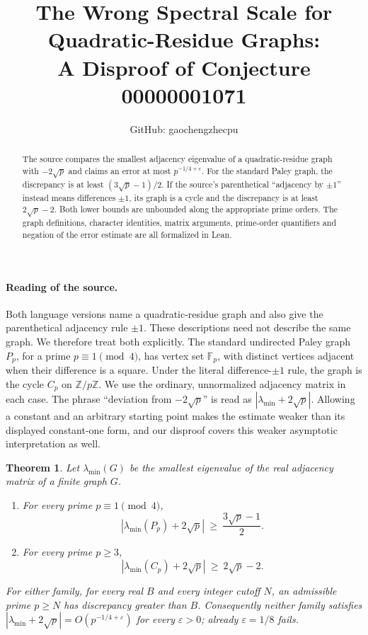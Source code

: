 \documentclass[11pt]{article}
\title{The Wrong Spectral Scale for Quadratic-Residue Graphs:\\A Disproof of Conjecture 00000001071}
\author{GitHub: gaochengzhecpu}
\date{}
\newtheorem{theorem}{Theorem}
\begin{document}
\maketitle
\begin{abstract}
The source compares the smallest adjacency eigenvalue of a quadratic-residue
graph with $-2\sqrt p$ and claims an error at most $p^{-1/4+\varepsilon}$.
For the standard Paley graph, the discrepancy is at least
$(3\sqrt p-1)/2$. If the source's parenthetical ``adjacency by $\pm1$''
instead means differences $\pm1$, its graph is a cycle and the discrepancy
is at least $2\sqrt p-2$. Both lower bounds are unbounded along the
appropriate prime orders. The graph definitions, character identities,
matrix arguments, prime-order quantifiers and negation of the error estimate
are all formalized in Lean.
\end{abstract}

\paragraph{Reading of the source.}
Both language versions name a quadratic-residue graph and also give the
parenthetical adjacency rule $\pm1$. These descriptions need not describe
the same graph. We therefore treat both explicitly. The standard undirected
Paley graph $P_p$, for a prime $p\equiv1\pmod4$, has vertex set
$\mathbb F_p$, with distinct vertices adjacent when their difference is a
square. Under the literal difference-$\pm1$ rule, the graph is the cycle
$C_p$ on $\mathbb Z/p\mathbb Z$. We use the ordinary, unnormalized adjacency
matrix in each case. The phrase ``deviation from $-2\sqrt p$'' is read as
$|\lambda_{\min}+2\sqrt p|$. Allowing a constant and an arbitrary starting
point makes the estimate weaker than its displayed constant-one form, and
our disproof covers this weaker asymptotic interpretation as well.

\begin{theorem}\label{thm:main}
Let $\lambda_{\min}(G)$ be the smallest eigenvalue of the real adjacency
matrix of a finite graph $G$.
\begin{enumerate}
\item For every prime $p\equiv1\pmod4$,
\[
 |\lambda_{\min}(P_p)+2\sqrt p|\ \geq\ \frac{3\sqrt p-1}{2}.
\]
\item For every prime $p\geq3$,
\[
 |\lambda_{\min}(C_p)+2\sqrt p|\ \geq\ 2\sqrt p-2.
\]
\end{enumerate}
For either family, for every real $B$ and every integer cutoff $N$, an
admissible prime $p\geq N$ has discrepancy greater than $B$.
Consequently neither family satisfies
$|\lambda_{\min}+2\sqrt p|=O(p^{-1/4+\varepsilon})$ for every
$\varepsilon>0$; already $\varepsilon=1/8$ fails.
\end{theorem}
\end{document}
